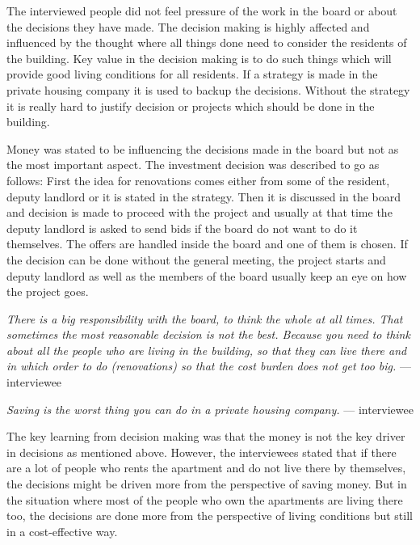 The interviewed people did not feel pressure of the work in the board or about the decisions they have made. The decision making is highly affected and influenced by the thought where all things done need to consider the residents of the building. Key value in the decision making is to do such things which will provide good living conditions for all residents. If a strategy is made in the private housing company it is used to backup the decisions. Without the strategy it is really hard to justify decision or projects which should be done in the building.

Money was stated to be influencing the decisions made in the board but not as the most important aspect. The investment decision was described to go as follows: First the idea for renovations comes either from some of the resident, deputy landlord or it is stated in the strategy. Then it is discussed in the board and decision is made to proceed with the project and usually at that time the deputy landlord is asked to send bids if the board do not want to do it themselves. The offers are handled inside the board and one of them is chosen. If the decision can be done without the general meeting, the project starts and deputy landlord as well as the members of the board usually keep an eye on how the project goes.

\begin{displayquote}
\textit{There is a big responsibility with the board, to think the whole at all times. That sometimes the most reasonable decision is not the best. Because you need to think about all the people who are living in the building, so that they can live there and in which order to do (renovations) so that the cost burden does not get too big.} --- interviewee
\end{displayquote}

\begin{displayquote}
\textit{Saving is the worst thing you can do in a private housing company.} --- interviewee
\end{displayquote}

The key learning from decision making was that the money is not the key driver in decisions as mentioned above. However, the interviewees stated that if there are a lot of people who rents the apartment and do not live there by themselves, the decisions might be driven more from the perspective of saving money. But in the situation where most of the people who own the apartments are living there too, the decisions are done more from the perspective of living conditions but still in a cost-effective way.

